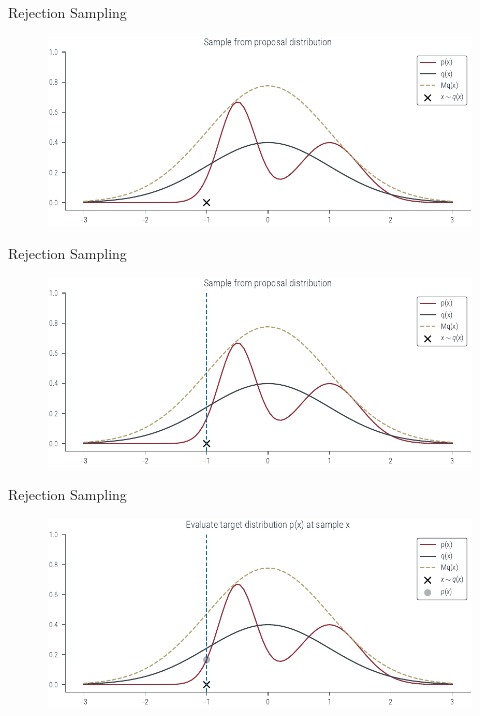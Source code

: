 \documentclass{beamer}
\begin{document}
    \begin{frame}{Rejection Sampling}
        \begin{figure}
            \centering
            \includegraphics[scale = 0.75]{../figures/sampling/rejection-sampling--1.0-True-True-True-False-False-False-False-False.pdf}
        \end{figure}
    \end{frame}

    \begin{frame}{Rejection Sampling}
        \begin{figure}
            \centering
            \includegraphics[scale = 0.75]{../figures/sampling/rejection-sampling--1.0-True-True-True-True-False-False-False-False.pdf}
        \end{figure}
    \end{frame}

    \begin{frame}{Rejection Sampling}
        \begin{figure}
            \centering
            \includegraphics[scale = 0.75]{../figures/sampling/rejection-sampling--1.0-True-True-True-True-True-False-False-False.pdf}
        \end{figure}
    \end{frame}
\end{document}
